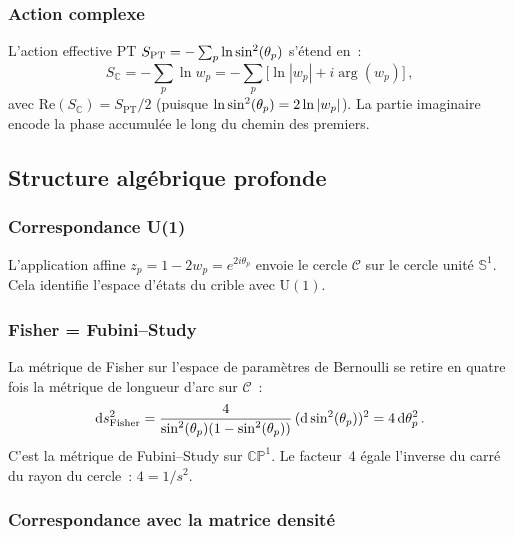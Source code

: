 \documentclass[12pt,a4paper]{article}
\begin{document}
\subsubsection{Action complexe}

L'action effective PT $S_{\mathrm{PT}} = -\sum_p \ln\sin^2(\theta_{p})$ s'étend
en~:
\begin{equation}
  S_{\mathbb{C}} = -\sum_p \ln w_p
  = -\sum_p \bigl[\ln|w_p| + i\arg(w_p)\bigr]\,,
  \label{eq:S_complex}
\end{equation}
avec $\mathrm{Re}(S_{\mathbb{C}}) = S_{\mathrm{PT}}/2$ (puisque
$\ln\sin^2(\theta_{p}) = 2\ln|w_p|$). La partie imaginaire encode la phase
accumulée le long du chemin des premiers.


\subsection{Structure algébrique profonde}
\label{sec:cx_algebra}

\subsubsection{Correspondance U(1)}

L'application affine $z_p = 1 - 2w_p = e^{2i\theta_p}$ envoie le
cercle $\mathcal{C}$ sur le cercle unité $\mathbb{S}^1$. Cela
identifie l'espace d'états du crible avec $\mathrm{U}(1)$.

\subsubsection{Fisher = Fubini--Study}

La métrique de Fisher sur l'espace de paramètres de Bernoulli se
retire en quatre fois la métrique de longueur d'arc sur
$\mathcal{C}$~:
\begin{equation}
  \mathrm{d}s^2_{\mathrm{Fisher}}
  = \frac{4}{\sin^2(\theta_{p})(1 - \sin^2(\theta_{p}))}\,(\mathrm{d}\sin^2(\theta_{p}))^2
  = 4\,\mathrm{d}\theta_p^2\,.
  \label{eq:fisher_fubini}
\end{equation}
C'est la métrique de Fubini--Study sur $\mathbb{CP}^1$. Le facteur~4
égale l'inverse du carré du rayon du cercle~: $4 = 1/s^2$.

\subsubsection{Correspondance avec la matrice densité}
\label{subsec:cx_density}
\end{document}
